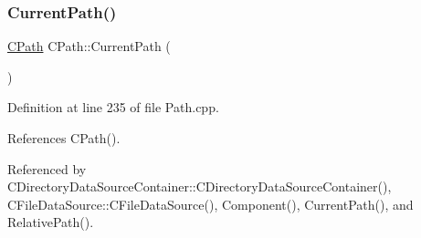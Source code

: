 \subsubsection{\texorpdfstring{Current\+Path()}{CurrentPath()}\hspace{0.1cm}{\footnotesize\ttfamily [1/2]}}
{\footnotesize\ttfamily \hyperlink{classCPath}{C\+Path} C\+Path\+::\+Current\+Path (\begin{DoxyParamCaption}{ }\end{DoxyParamCaption})\hspace{0.3cm}{\ttfamily [static]}}



Definition at line 235 of file Path.\+cpp.



References C\+Path().



Referenced by C\+Directory\+Data\+Source\+Container\+::\+C\+Directory\+Data\+Source\+Container(), C\+File\+Data\+Source\+::\+C\+File\+Data\+Source(), Component(), Current\+Path(), and Relative\+Path().



